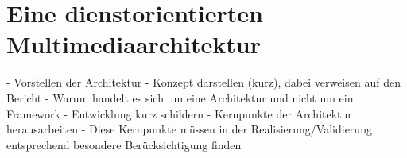 \chapter{Eine dienstorientierten Multimediaarchitektur} %
\label{cha:eine_dienstorientierten_multimediaarchitektur}

- Vorstellen der Architektur
- Konzept darstellen (kurz), dabei verweisen auf den Bericht
- Warum handelt es sich um eine Architektur und nicht um ein Framework
- Entwicklung kurz schildern
- Kernpunkte der Architektur herausarbeiten
- Diese Kernpunkte müssen in der Realisierung/Validierung entsprechend besondere Berücksichtigung finden

